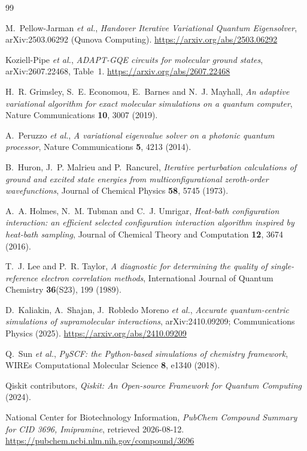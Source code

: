 \documentclass[11pt,a4paper]{article}
\begin{document}
\begin{thebibliography}{99}
\small

M.~Pellow-Jarman \emph{et al.},
\emph{Handover Iterative Variational Quantum Eigensolver},
arXiv:2503.06292 (Qunova Computing).
\url{https://arxiv.org/abs/2503.06292}

Koziell-Pipe \emph{et al.},
\emph{ADAPT-GQE circuits for molecular ground states},
arXiv:2607.22468, Table~1.
\url{https://arxiv.org/abs/2607.22468}

H.~R. Grimsley, S.~E. Economou, E.~Barnes and N.~J. Mayhall,
\emph{An adaptive variational algorithm for exact molecular simulations on a
quantum computer},
Nature Communications \textbf{10}, 3007 (2019).

A.~Peruzzo \emph{et al.},
\emph{A variational eigenvalue solver on a photonic quantum processor},
Nature Communications \textbf{5}, 4213 (2014).

B.~Huron, J.~P. Malrieu and P.~Rancurel,
\emph{Iterative perturbation calculations of ground and excited state energies
from multiconfigurational zeroth-order wavefunctions},
Journal of Chemical Physics \textbf{58}, 5745 (1973).

A.~A. Holmes, N.~M. Tubman and C.~J. Umrigar,
\emph{Heat-bath configuration interaction: an efficient selected configuration
interaction algorithm inspired by heat-bath sampling},
Journal of Chemical Theory and Computation \textbf{12}, 3674 (2016).

T.~J. Lee and P.~R. Taylor,
\emph{A diagnostic for determining the quality of single-reference electron
correlation methods},
International Journal of Quantum Chemistry \textbf{36}(S23), 199 (1989).

D.~Kaliakin, A.~Shajan, J.~Robledo Moreno \emph{et al.},
\emph{Accurate quantum-centric simulations of supramolecular interactions},
arXiv:2410.09209; Communications Physics (2025).
\url{https://arxiv.org/abs/2410.09209}

Q.~Sun \emph{et al.},
\emph{PySCF: the Python-based simulations of chemistry framework},
WIREs Computational Molecular Science \textbf{8}, e1340 (2018).

Qiskit contributors,
\emph{Qiskit: An Open-source Framework for Quantum Computing} (2024).

National Center for Biotechnology Information,
\emph{PubChem Compound Summary for CID 3696, Imipramine}, retrieved
2026-08-12.
\url{https://pubchem.ncbi.nlm.nih.gov/compound/3696}

\end{thebibliography}
\end{document}
